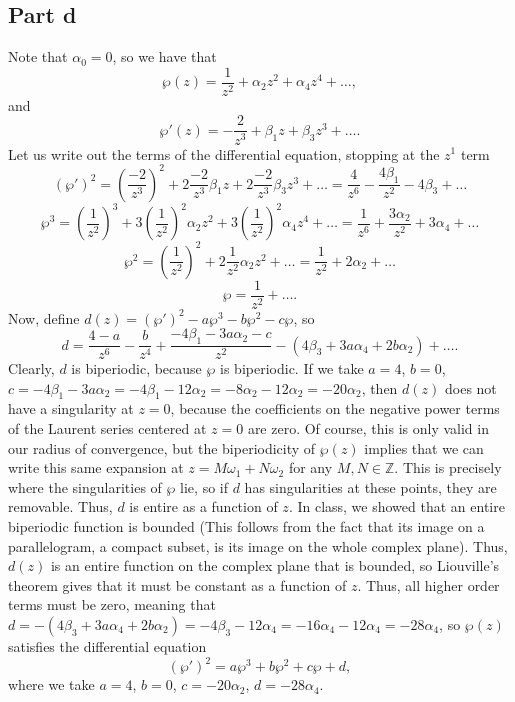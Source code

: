 \documentclass{article}
\begin{document}
\subsection{Part d}
Note that $\alpha_0=0$, so we have that 
\[
		\wp(z)=\frac{1}{z^2}+\alpha_2 z^2+\alpha_4 z^4+\ldots,
		\]
		and
		\[
		\wp'(z)=-\frac{2}{z^3}+\beta_1 z+\beta_3 z^3+\ldots.
\]
Let us write out the terms of the differential equation, stopping at the $z^1$ term
\[
(\wp')^2=\left(\frac{-2}{z^3}\right)^2+2\frac{-2}{z^3}\beta_1z+2\frac{-2}{z^3}\beta_3z^3+\ldots=\frac{4}{z^6}-\frac{4\beta_1}{z^2}-4\beta_3+\ldots
\]
\[
\wp^3=\left(\frac{1}{z^2}\right)^3+3\left(\frac{1}{z^2}\right)^2\alpha_2z^2+3\left(\frac{1}{z^2}\right)^2\alpha_4z^4+\ldots=\frac{1}{z^6}+\frac{3\alpha_2}{z^2}+3\alpha_4+\ldots
\]
\[
\wp^2=\left(\frac{1}{z^2}\right)^2+2\frac{1}{z^2}\alpha_2z^2+\ldots=\frac{1}{z^2}+2\alpha_2+\ldots
\]
\[
\wp=\frac{1}{z^2}+\ldots.
\]
Now, define $d(z)=(\wp')^2-a\wp^3-b\wp^2-c\wp$, so 
\[
d=\frac{4-a}{z^6}-\frac{b}{z^4}+\frac{-4\beta_1-3a\alpha_2-c}{z^2}-(4\beta_3+3a\alpha_4+2b\alpha_2)+\ldots.
\]
Clearly, $d$ is biperiodic, because $\wp$ is biperiodic. If we take $a=4$, $b=0$, $c=-4\beta_1-3a\alpha_2=-4\beta_1-12\alpha_2=-8\alpha_2-12\alpha_2=-20\alpha_2$, then $d(z)$ does not have a singularity at $z=0$, because the coefficients on the negative power terms of the Laurent series centered at $z=0$ are zero. Of course, this is only valid in our radius of convergence, but the biperiodicity of $\wp(z)$ implies that we can write this same expansion at $z=M\omega_1+N\omega_2$ for any $M,N\in\mathbb{Z}$. This is precisely where the singularities of $\wp$ lie, so if $d$ has singularities at these points, they are removable. Thus, $d$ is entire as a function of $z$. In class, we showed that an entire biperiodic function is bounded (This follows from the fact that its image on a parallelogram, a compact subset, is its image on the whole complex plane). Thus, $d(z)$ is an entire function on the complex plane that is bounded, so Liouville's theorem gives that it must be constant as a function of $z$. Thus, all higher order terms must be zero, meaning that $d=-(4\beta_3+3a\alpha_4+2b\alpha_2)=-4\beta_3-12\alpha_4=-16\alpha_4-12\alpha_4=-28\alpha_4$, so $\wp(z)$ satisfies the differential equation
\[
		(\wp')^2=a \wp^3+b \wp^2+c \wp+d,
\]
where we take $a=4$, $b=0$, $c=-20\alpha_2$, $d=-28\alpha_4$. 
\end{document}
